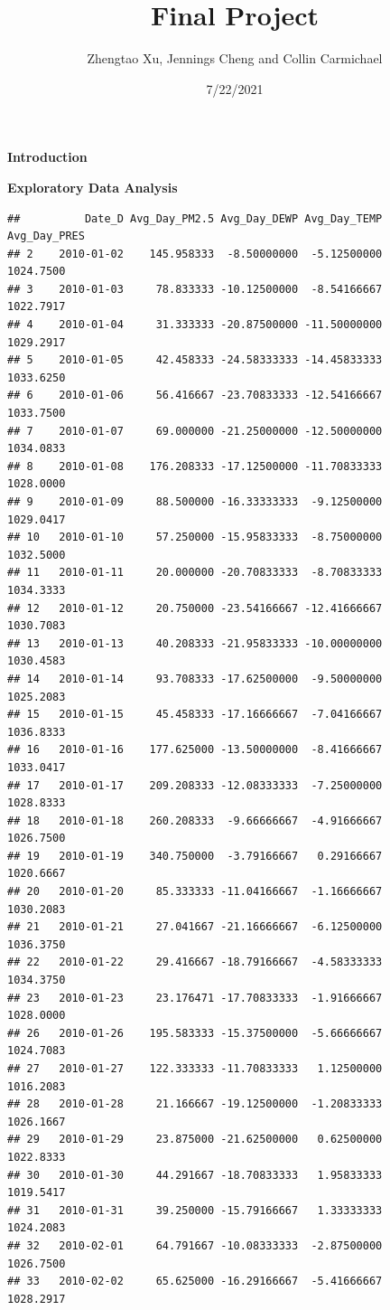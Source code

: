\documentclass[
]{article}
\title{Final Project}
\author{Zhengtao Xu, Jennings Cheng and Collin Carmichael}
\date{7/22/2021}
\begin{document}
\maketitle

\textbf{Introduction}

\textbf{Exploratory Data Analysis}

\begin{verbatim}
##          Date_D Avg_Day_PM2.5 Avg_Day_DEWP Avg_Day_TEMP Avg_Day_PRES
## 2    2010-01-02    145.958333  -8.50000000  -5.12500000    1024.7500
## 3    2010-01-03     78.833333 -10.12500000  -8.54166667    1022.7917
## 4    2010-01-04     31.333333 -20.87500000 -11.50000000    1029.2917
## 5    2010-01-05     42.458333 -24.58333333 -14.45833333    1033.6250
## 6    2010-01-06     56.416667 -23.70833333 -12.54166667    1033.7500
## 7    2010-01-07     69.000000 -21.25000000 -12.50000000    1034.0833
## 8    2010-01-08    176.208333 -17.12500000 -11.70833333    1028.0000
## 9    2010-01-09     88.500000 -16.33333333  -9.12500000    1029.0417
## 10   2010-01-10     57.250000 -15.95833333  -8.75000000    1032.5000
## 11   2010-01-11     20.000000 -20.70833333  -8.70833333    1034.3333
## 12   2010-01-12     20.750000 -23.54166667 -12.41666667    1030.7083
## 13   2010-01-13     40.208333 -21.95833333 -10.00000000    1030.4583
## 14   2010-01-14     93.708333 -17.62500000  -9.50000000    1025.2083
## 15   2010-01-15     45.458333 -17.16666667  -7.04166667    1036.8333
## 16   2010-01-16    177.625000 -13.50000000  -8.41666667    1033.0417
## 17   2010-01-17    209.208333 -12.08333333  -7.25000000    1028.8333
## 18   2010-01-18    260.208333  -9.66666667  -4.91666667    1026.7500
## 19   2010-01-19    340.750000  -3.79166667   0.29166667    1020.6667
## 20   2010-01-20     85.333333 -11.04166667  -1.16666667    1030.2083
## 21   2010-01-21     27.041667 -21.16666667  -6.12500000    1036.3750
## 22   2010-01-22     29.416667 -18.79166667  -4.58333333    1034.3750
## 23   2010-01-23     23.176471 -17.70833333  -1.91666667    1028.0000
## 26   2010-01-26    195.583333 -15.37500000  -5.66666667    1024.7083
## 27   2010-01-27    122.333333 -11.70833333   1.12500000    1016.2083
## 28   2010-01-28     21.166667 -19.12500000  -1.20833333    1026.1667
## 29   2010-01-29     23.875000 -21.62500000   0.62500000    1022.8333
## 30   2010-01-30     44.291667 -18.70833333   1.95833333    1019.5417
## 31   2010-01-31     39.250000 -15.79166667   1.33333333    1024.2083
## 32   2010-02-01     64.791667 -10.08333333  -2.87500000    1026.7500
## 33   2010-02-02     65.625000 -16.29166667  -5.41666667    1028.2917

\end{verbatim}
\end{document}
